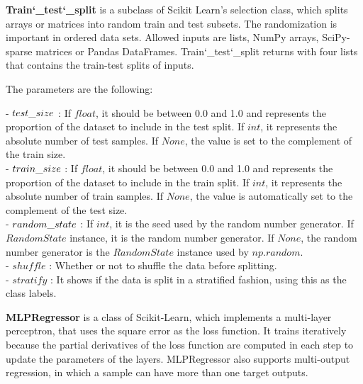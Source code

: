 \textbf{Train\char`_test\char`_split} is a subclass of Scikit Learn's selection class, which splits arrays or matrices into random train and test subsets. The randomization is important in ordered data sets. Allowed inputs are lists, NumPy arrays, SciPy-sparse matrices or Pandas DataFrames. Train\char`_test\char`_split returns with four lists that contains the train-test splits of inputs.\medskip

\noindent The parameters are the following:\smallskip

\noindent - $test\char`_size$ : If $float$, it should be between 0.0 and 1.0 and represents the proportion of the dataset to include in the test split. If $int$, it represents the absolute number of test samples. If $None$, the value is set to the complement of the train size. \\
- $train\char`_size$ : If $float$, it should be between 0.0 and 1.0 and represents the proportion of the dataset to include in the train split. If $int$, it represents the absolute number of train samples. If $None$, the value is automatically set to the complement of the test size.\\
- $random\char`_state$ : If $int$, it is the seed used by the random number generator. If $RandomState$ instance, it is the random number generator. If $None$, the random number generator is the $RandomState$ instance used by $np.random$.\\
- $shuffle$ : Whether or not to shuffle the data before splitting.\\
- $stratify$ : It shows if the data is split in a stratified fashion, using this as the class labels.\bigskip


\textbf{MLPRegressor} \cite{bengfort2018applied} is a class of Scikit-Learn, which implements a multi-layer perceptron, that uses the square error as the loss function. It trains iteratively because the partial derivatives of the loss function are computed in each step to update the parameters of the layers. MLPRegressor also supports multi-output regression, in which a sample can have more than one target outputs.\medskip

